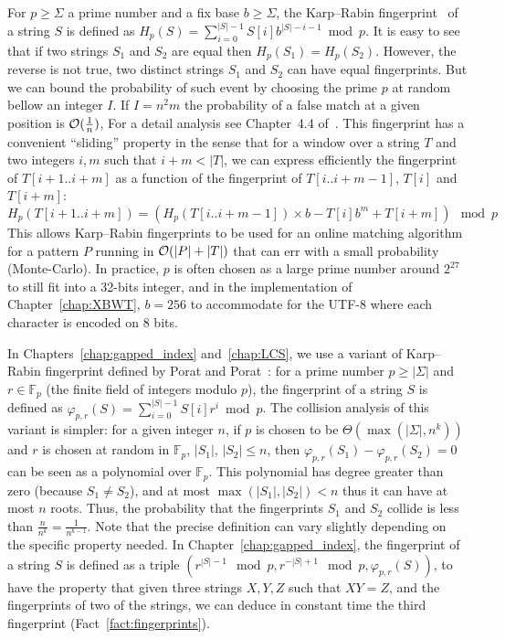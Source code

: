 For $p \geq \Sigma$ a prime number and a fix base $b\geq \Sigma$, the Karp--Rabin fingerprint~\cite{DBLP:journals/ibmrd/KarpR87} of a string $S$ is defined as
$H_{p}(S) = \sum_{i = 0}^{|S|-1}  S[i]b^{|S|-i-1} \bmod p$.
It is easy to see that if two strings $S_1$ and $S_2$ are equal then $H_p(S_1) = H_p(S_2)$. However, the reverse is not true, two distinct strings $S_1$ and $S_2$ can have equal fingerprints.
%
But we can bound the probability of such event by choosing the prime $p$ at random bellow an integer $I$. If $I=n^2m$ the probability of a false match at a given position is $\mathcal{O}(\frac{1}{n})$, For a detail analysis see Chapter~4.4 of~\cite{Gusfield1997}.
This fingerprint has a convenient ``sliding'' property in the sense that for a window over a string $T$ and two integers $i,m$ such that $i+m < |T|$, we can express efficiently the fingerprint of $T[i+1..i+m]$ as a function of the fingerprint of $T[i..i+m-1]$, $T[i]$ and $T[i+m]$:
$$ H_{p}(T[i+1..i+m]) = ( H_{p}(T[i..i+m-1])\times b - T[i]b^{m} + T[i+m]  ) \mod p$$
This allows Karp--Rabin fingerprints to be used for an online matching algorithm for a pattern $P$ running in $\mathcal{O}(|P|+|T|)$ that can err with a small probability (Monte-Carlo).
In practice, $p$ is often chosen as a large prime number around $2^{27}$ to still fit into a 32-bits integer, and in the implementation of Chapter~\ref{chap:XBWT}, $b=256$ to accommodate for the UTF-8 where each character is encoded on 8 bits.

In Chapters~\ref{chap:gapped_index} and~\ref{chap:LCS}, we use a variant of Karp--Rabin fingerprint defined by Porat and Porat~\cite{Porat:09}: 
for a prime number $p\geq |\Sigma|$  and $r \in \mathbb{F}_p$ (the finite field of integers modulo $p$), the fingerprint of a string $S$ is defined as
$\varphi_{p,r}(S) = \sum_{i = 0}^{|S|-1}  S[i]r^{i} \bmod p$.
The collision analysis of this variant is simpler: %
for a given integer $n$, if $p$ is chosen to be $\Theta(\max(|\Sigma|,n^k))$ and $r$ is chosen at random in $\mathbb{F}_p$, $|S_1|$, $|S_2|\leq n$, then $\varphi_{p,r}(S_1) - \varphi_{p,r}(S_2) = 0$ can be seen as a polynomial over $\mathbb{F}_p$. This polynomial has degree greater than zero (because $S_1 \neq S_2$), and at most $\max(|S_1|,|S_2|) < n$ thus it can have at most $n$ roots. Thus, the probability that the fingerprints $S_1$ and $S_2$ collide is less than $\frac{n}{n^k} = \frac{1}{n^{k-1}}$.
Note that the precise definition can vary slightly depending on the specific property needed. In Chapter~\ref{chap:gapped_index}, the fingerprint of a string $S$ is defined as a triple $(r^{|S|-1} \mod p, r^{-|S|+1} \mod p, \varphi_{p,r}(S))$, to have the property that given three strings $X,Y,Z$ such that $XY =Z$, and the fingerprints of two of the strings, we can deduce in constant time the third fingerprint (Fact~\ref{fact:fingerprints}). 


